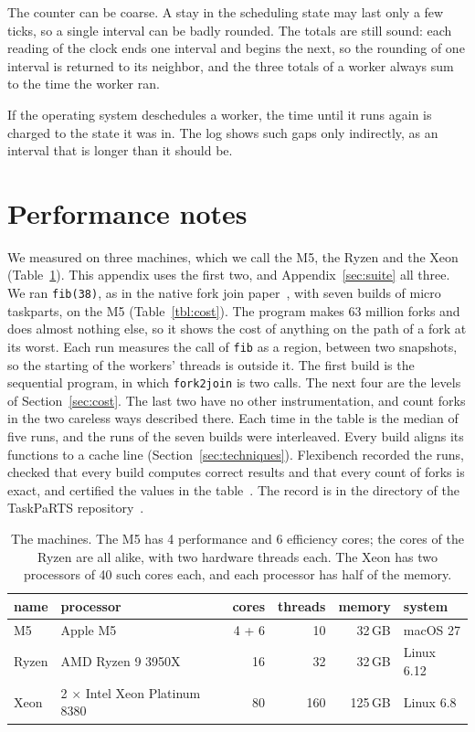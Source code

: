 \documentclass[sigplan,nonacm]{acmart}
\begin{document}
The counter can be coarse.
%
A stay in the scheduling state may last only a few ticks, so a single
interval can be badly rounded.
%
The totals are still sound: each reading of the clock ends one
interval and begins the next, so the rounding of one interval is
returned to its neighbor, and the three totals of a worker always sum
to the time the worker ran.

If the operating system deschedules a worker, the time until it runs
again is charged to the state it was in.
%
The log shows such gaps only indirectly, as an interval that is longer
than it should be.

\section{Performance notes}
\label{sec:perf}

We measured on three machines, which we call the M5, the Ryzen and
the Xeon (Table~\ref{tbl:machines}).
%
This appendix uses the first two, and Appendix~\ref{sec:suite} all
three.
%
We ran \lstinline|fib(38)|, as in the native fork join
paper~\cite{nativeforkjoin}, with seven builds of micro taskparts, on
the M5 (Table~\ref{tbl:cost}).
%
The program makes 63 million forks and does almost nothing else, so it
shows the cost of anything on the path of a fork at its worst.
%
Each run measures the call of \lstinline|fib| as a region, between two
snapshots, so the starting of the workers' threads is outside it.
%
The first build is the sequential program, in which
\lstinline|fork2join| is two calls.
%
The next four are the levels of Section~\ref{sec:cost}.
%
The last two have no other instrumentation, and count forks in the two
careless ways described there.
%
Each time in the table is the median of five runs, and the runs of the
seven builds were interleaved.
%
Every build aligns its functions to a cache line
(Section~\ref{sec:techniques}).
%
Flexibench recorded the runs, checked that every build computes
correct results and that every count of forks is exact, and certified
the values in the table~\cite{flexibench-times}.
%
The record is in the directory  of the
TaskPaRTS repository~\cite{taskparts}.

\begin{table}
\footnotesize
\setlength{\tabcolsep}{2pt}
\begin{tabular}{@{}llrrrl@{}}
\toprule
name & processor & cores & threads & memory & system \\
\midrule
M5 & Apple M5 & 4 + 6 & 10 & 32\,GB & macOS 27 \\
Ryzen & AMD Ryzen 9 3950X & 16 & 32 & 32\,GB & Linux 6.12 \\
Xeon & 2 $\times$ Intel Xeon Platinum 8380 & 80 & 160 & 125\,GB & Linux 6.8 \\
\bottomrule
\end{tabular}
\caption{The machines.  The M5 has 4 performance and 6 efficiency
  cores; the cores of the Ryzen are all alike, with two hardware
  threads each.  The Xeon has two processors of 40 such cores each,
  and each processor has half of the memory.}
\label{tbl:machines}
\end{table}
\end{document}
